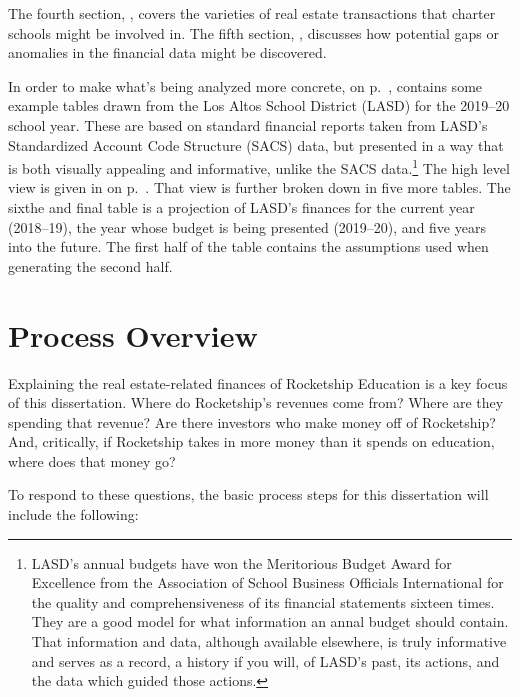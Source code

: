 The fourth section, , covers the varieties of real estate transactions that charter schools might be involved in. The fifth section, , discusses how potential gaps or anomalies in the financial data might be discovered. 

In order to make what's being analyzed more concrete,  on p.~\pageref{appx:ca-school-financing}, contains some example tables drawn from the Los Altos School District (LASD) for the 2019–20 school year. These are based on standard financial reports taken from LASD's Standardized Account Code Structure (SACS) data, but presented in a way that is both visually appealing and informative, unlike the SACS data.\footnote{LASD's annual budgets have won the Meritorious Budget Award for Excellence from the Association of School Business Officials International for the quality and comprehensiveness of its financial statements sixteen times. They are a good model for what information an annal budget should contain. That information and data, although available elsewhere, is truly informative and serves as a record, a history if you will, of LASD's past, its actions, and the data which guided those actions.} The high level view is given in  on p.~\pageref{fig:LASD_All_Funds_Summary}. That view is further broken down in five more tables. The sixthe and final table is a projection of LASD's finances for the current year (2018–19), the year whose budget is being presented (2019–20), and five years into the future. The first half of the table contains the assumptions used when generating the second half.

\section{Process Overview}\label{sec:process-overview}\indent%

Explaining the real estate-related finances of Rocketship Education is a key focus of this dissertation. Where do Rocketship's revenues come from? Where are they spending that revenue? Are there investors who make money off of Rocketship? And, critically, if Rocketship takes in more money than it spends on education, where does that money go?

To respond to these questions, the basic process steps for this dissertation will include the following:

